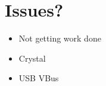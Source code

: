 \section{Issues?}
\begin{itemize}
    \item Not getting work done
    \item Crystal
    \item USB VBus
\end{itemize}
